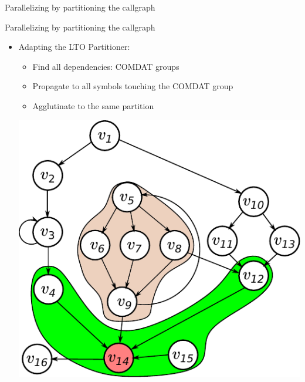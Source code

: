 \begin{frame}{Parallelizing by partitioning the callgraph}
{{
}
}
\end{frame}


\begin{frame}{Parallelizing by partitioning the callgraph}

\begin{itemize}
    \item Adapting the LTO Partitioner:
    \begin{itemize}
        \item Find all dependencies: COMDAT groups
        \item Propagate to all symbols touching the COMDAT group
        \item Agglutinate to the same partition
    \end{itemize}
\begin{center}
	 \includegraphics[scale=0.5]{figuras/comdat_frontier.pdf}
\end{center}
\end{itemize}
\end{frame}

